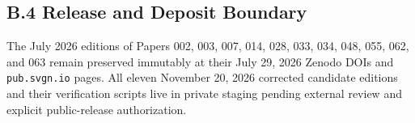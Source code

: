\documentclass[
  american,
  11pt,
  letterpaper,
]{article}
\begin{document}
\subsection{B.4 Release and Deposit Boundary}\label{b.4-release-and-deposit-boundary}

The July 2026 editions of Papers 002, 003, 007, 014, 028, 033, 034, 048, 055, 062, and 063 remain preserved immutably at their July 29, 2026 Zenodo DOIs and \texttt{pub.svgn.io} pages. All eleven November 20, 2026 corrected candidate editions and their verification scripts live in private staging pending external review and explicit public-release authorization.
\end{document}
